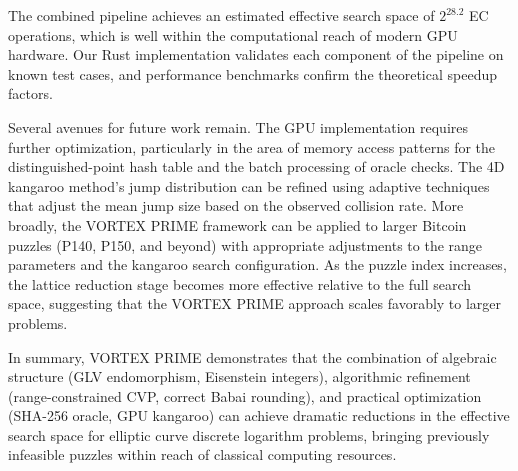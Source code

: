 \documentclass[11pt,a4paper]{article}
\theoremstyle{definition}
\begin{document}
The combined pipeline achieves an estimated effective search space of $2^{28.2}$ EC operations, which is well within the computational reach of modern GPU hardware. Our Rust implementation validates each component of the pipeline on known test cases, and performance benchmarks confirm the theoretical speedup factors.

Several avenues for future work remain. The GPU implementation requires further optimization, particularly in the area of memory access patterns for the distinguished-point hash table and the batch processing of oracle checks. The 4D kangaroo method's jump distribution can be refined using adaptive techniques that adjust the mean jump size based on the observed collision rate. More broadly, the VORTEX PRIME framework can be applied to larger Bitcoin puzzles (P140, P150, and beyond) with appropriate adjustments to the range parameters and the kangaroo search configuration. As the puzzle index increases, the lattice reduction stage becomes more effective relative to the full search space, suggesting that the VORTEX PRIME approach scales favorably to larger problems.

In summary, VORTEX PRIME demonstrates that the combination of algebraic structure (GLV endomorphism, Eisenstein integers), algorithmic refinement (range-constrained CVP, correct Babai rounding), and practical optimization (SHA-256 oracle, GPU kangaroo) can achieve dramatic reductions in the effective search space for elliptic curve discrete logarithm problems, bringing previously infeasible puzzles within reach of classical computing resources.
\end{document}
